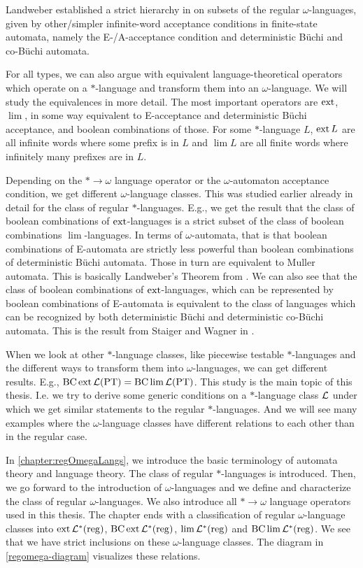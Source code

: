 Landweber established a strict hierarchy in \cite{Landweber69} on subsets of the regular $\omega$-languages, given by other/simpler infinite-word acceptance conditions in finite-state automata, namely the E-/A-acceptance condition and deterministic Büchi and co-Büchi automata.

For all types, we can also argue with equivalent language-theoretical operators which operate on a $*$-language and transform them into an $\omega$-language. We will study the equivalences in more detail. The most important operators are $\operatorname{ext}$, $\lim$, in some way equivalent to E-acceptance and deterministic Büchi acceptance, and boolean combinations of those. For some $*$-language $L$, $\operatorname{ext} L$ are all infinite words where some prefix is in $L$ and $\lim L$ are all finite words where infinitely many prefixes are in $L$.

Depending on the $* \rightarrow \omega$ language operator or the $\omega$-automaton acceptance condition, we get different $\omega$-language classes. This was studied earlier already in detail for the class of regular $*$-languages. E.g., we get the result that the class of boolean combinations of $\operatorname{ext}$-languages is a strict subset of the class of boolean combinations $\lim$-languages. In terms of $\omega$-automata, that is that boolean combinations of E-automata are strictly less powerful than boolean combinations of deterministic Büchi automata. Those in turn are equivalent to Muller automata. This is basically Landweber's Theorem from \cite{Landweber69}. We can also see that the class of boolean combinations of $\operatorname{ext}$-languages, which can be represented by boolean combinations of E-automata is equivalent to the class of languages which can be recognized by both deterministic Büchi and deterministic co-Büchi automata. This is the result from Staiger and Wagner in \cite{StaigerW74}.

When we look at other $*$-language classes, like piecewise testable $*$-languages and the different ways to transform them into $\omega$-languages, we can get different results. E.g., $\operatorname{BC} \operatorname{ext} \mathcal{L}(\textup{\textrm{PT}}) = \operatorname{BC} \lim \mathcal{L}(\textup{\textrm{PT}})$. This study is the main topic of this thesis. I.e. we try to derive some generic conditions on a $*$-language class $\mathcal{L}$ under which we get similar statements to the regular $*$-languages. And we will see many examples where the $\omega$-language classes have different relations to each other than in the regular case.

In \cref{chapter:regOmegaLangs}, we introduce the basic terminology of automata theory and language theory. The class of regular $*$-languages is introduced. Then, we go forward to the introduction of $\omega$-languages and we define and characterize the class of regular $\omega$-languages. We also introduce all $* \rightarrow \omega$ language operators used in this thesis. The chapter ends with a classification of regular $\omega$-language classes into $\operatorname{ext} \mathcal{L}^*(\textup{\textrm{reg}})$, $\operatorname{BC} \operatorname{ext} \mathcal{L}^*(\textup{\textrm{reg}})$, $\lim \mathcal{L}^*(\textup{\textrm{reg}})$ and $\operatorname{BC} \lim \mathcal{L}^*(\textup{\textrm{reg}})$. We see that we have strict inclusions on these $\omega$-language classes. The diagram in \cref{regomega-diagram} visualizes these relations.

